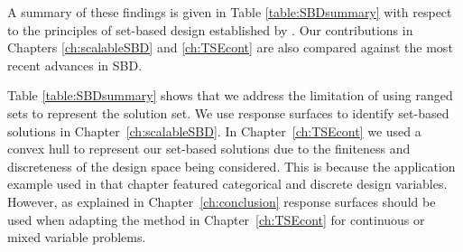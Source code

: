 A summary of these findings is given in Table \ref{table:SBDsummary} with respect to the principles of set-based design established by \citeauthor{SobekIi1999} \cite{SobekIi1999}. Our contributions in Chapters \ref{ch:scalableSBD} and \ref{ch:TSEcont} are also compared against the most recent advances in \ac{SBD}.

Table \ref{table:SBDsummary} shows that we address the limitation of using ranged sets to represent the solution set. We use response surfaces to identify set-based solutions in Chapter~\ref{ch:scalableSBD}. In Chapter~\ref{ch:TSEcont} we used a convex hull to represent our set-based solutions due to the finiteness and discreteness of the design space being considered. This is because the application example used in that chapter featured categorical and discrete design variables. However, as explained in Chapter~\ref{ch:conclusion} response surfaces should be used when adapting the method in Chapter~\ref{ch:TSEcont} for continuous or mixed variable problems.

\renewcommand{\changeCW}{0.55cm}
\renewcommand{\mycontCW}{1.2cm}


